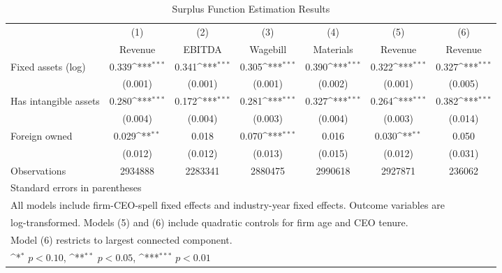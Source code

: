 \begin{table}[htbp]\centering
\def\sym#1{\ifmmode^{#1}\else\(^{#1}\)\fi}
\caption{Surplus Function Estimation Results}
\begin{tabular}{l*{6}{c}}
\toprule
                    &\multicolumn{1}{c}{(1)}&\multicolumn{1}{c}{(2)}&\multicolumn{1}{c}{(3)}&\multicolumn{1}{c}{(4)}&\multicolumn{1}{c}{(5)}&\multicolumn{1}{c}{(6)}\\
                    &\multicolumn{1}{c}{Revenue}&\multicolumn{1}{c}{EBITDA}&\multicolumn{1}{c}{Wagebill}&\multicolumn{1}{c}{Materials}&\multicolumn{1}{c}{Revenue}&\multicolumn{1}{c}{Revenue}\\
\midrule
Fixed assets (log)  &       0.339\sym{***}&       0.341\sym{***}&       0.305\sym{***}&       0.390\sym{***}&       0.322\sym{***}&       0.327\sym{***}\\
                    &     (0.001)         &     (0.001)         &     (0.001)         &     (0.002)         &     (0.001)         &     (0.005)         \\
\addlinespace
Has intangible assets&       0.280\sym{***}&       0.172\sym{***}&       0.281\sym{***}&       0.327\sym{***}&       0.264\sym{***}&       0.382\sym{***}\\
                    &     (0.004)         &     (0.004)         &     (0.003)         &     (0.004)         &     (0.003)         &     (0.014)         \\
\addlinespace
Foreign owned       &       0.029\sym{**} &       0.018         &       0.070\sym{***}&       0.016         &       0.030\sym{**} &       0.050         \\
                    &     (0.012)         &     (0.012)         &     (0.013)         &     (0.015)         &     (0.012)         &     (0.031)         \\
\midrule
Observations        &     2934888         &     2283341         &     2880475         &     2990618         &     2927871         &      236062         \\
\bottomrule
\multicolumn{7}{l}{\footnotesize Standard errors in parentheses}\\
\multicolumn{7}{l}{\footnotesize All models include firm-CEO-spell fixed effects and industry-year fixed effects. Outcome variables are}\\
\multicolumn{7}{l}{\footnotesize log-transformed. Models (5) and (6) include quadratic controls for firm age and CEO tenure.}\\
\multicolumn{7}{l}{\footnotesize Model (6) restricts to largest connected component.}\\
\multicolumn{7}{l}{\footnotesize \sym{*} \(p<0.10\), \sym{**} \(p<0.05\), \sym{***} \(p<0.01\)}\\
\end{tabular}
\end{table}
